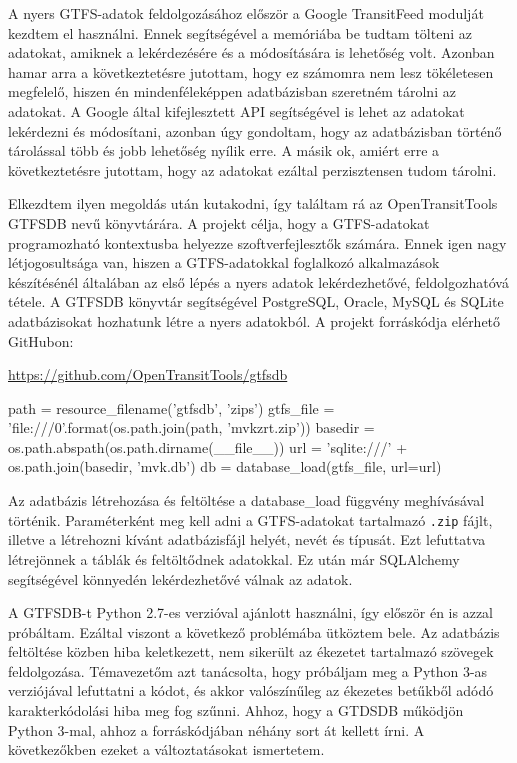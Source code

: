 
A nyers GTFS-adatok feldolgozásához először a Google TransitFeed modulját kezdtem el használni. Ennek segítségével a memóriába be tudtam tölteni az adatokat, amiknek a lekérdezésére és a módosítására is lehetőség volt. Azonban hamar arra a következtetésre jutottam, hogy ez számomra nem lesz tökéletesen megfelelő, hiszen én mindenféleképpen adatbázisban szeretném tárolni az adatokat. A Google által kifejlesztett API segítségével is lehet az adatokat lekérdezni és módosítani, azonban úgy gondoltam, hogy az adatbázisban történő tárolással több és jobb lehetőség nyílik erre. A másik ok, amiért erre a következtetésre jutottam, hogy az adatokat ezáltal perzisztensen tudom tárolni.

Elkezdtem ilyen megoldás után kutakodni, így találtam rá az OpenTransitTools GTFSDB nevű könyvtárára. A projekt célja, hogy a GTFS-adatokat programozható kontextusba helyezze szoftverfejlesztők számára. Ennek igen nagy létjogosultsága van, hiszen a GTFS-adatokkal foglalkozó alkalmazások készítésénél általában az első lépés a nyers adatok lekérdezhetővé, feldolgozhatóvá tétele. A GTFSDB könyvtár segítségével PostgreSQL, Oracle, MySQL és SQLite adatbázisokat hozhatunk létre a nyers adatokból. A projekt forráskódja elérhető GitHubon:

\begin{center}
\url{https://github.com/OpenTransitTools/gtfsdb}
\end{center}

\begin{python}
path = resource_filename('gtfsdb', 'zips')
gtfs_file = 'file:///{0}'.format(os.path.join(path, 'mvkzrt.zip'))
basedir = os.path.abspath(os.path.dirname(__file__))
url = 'sqlite:///' + os.path.join(basedir, 'mvk.db')
db = database_load(gtfs_file, url=url)
\end{python}

Az adatbázis létrehozása és feltöltése a database\_load függvény meghívásával történik. Paraméterként meg kell adni a GTFS-adatokat tartalmazó \texttt{.zip} fájlt, illetve a létrehozni kívánt adatbázisfájl helyét, nevét és típusát. Ezt lefuttatva létrejönnek a táblák és feltöltődnek adatokkal. Ez után már SQLAlchemy segítségével könnyedén lekérdezhetővé válnak az adatok.

A GTFSDB-t Python 2.7-es verzióval ajánlott használni, így először én is azzal próbáltam. Ezáltal viszont a következő problémába ütköztem bele. Az adatbázis feltöltése közben hiba keletkezett, nem sikerült az ékezetet tartalmazó szövegek feldolgozása. Témavezetőm azt tanácsolta, hogy próbáljam meg a Python 3-as verziójával lefuttatni a kódot, és akkor valószínűleg az ékezetes betűkből adódó karakterkódolási hiba meg fog szűnni. Ahhoz, hogy a GTDSDB működjön Python 3-mal, ahhoz a forráskódjában néhány sort át kellett írni. A következőkben ezeket a változtatásokat ismertetem.

